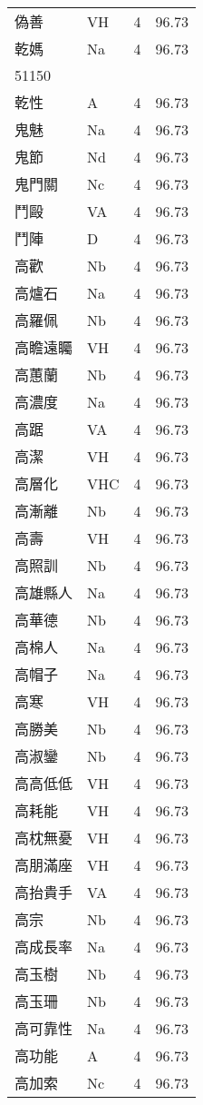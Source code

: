 \documentclass[twocolumn]{book}
\begin{document}
\begin{supertabular}{llrr}
偽善 & VH & 4 &  96.73\\
乾媽 & Na & 4 &  96.73\\
51150\\
乾性 & A & 4 &  96.73\\
鬼魅 & Na & 4 &  96.73\\
鬼節 & Nd & 4 &  96.73\\
鬼門關 & Nc & 4 &  96.73\\
鬥毆 & VA & 4 &  96.73\\
鬥陣 & D & 4 &  96.73\\
高歡 & Nb & 4 &  96.73\\
高爐石 & Na & 4 &  96.73\\
高羅佩 & Nb & 4 &  96.73\\
高瞻遠矚 & VH & 4 &  96.73\\
高蕙蘭 & Nb & 4 &  96.73\\
高濃度 & Na & 4 &  96.73\\
高踞 & VA & 4 &  96.73\\
高潔 & VH & 4 &  96.73\\
高層化 & VHC & 4 &  96.73\\
高漸離 & Nb & 4 &  96.73\\
高壽 & VH & 4 &  96.73\\
高照訓 & Nb & 4 &  96.73\\
高雄縣人 & Na & 4 &  96.73\\
高華德 & Nb & 4 &  96.73\\
高棉人 & Na & 4 &  96.73\\
高帽子 & Na & 4 &  96.73\\
高寒 & VH & 4 &  96.73\\
高勝美 & Nb & 4 &  96.73\\
高淑鑾 & Nb & 4 &  96.73\\
高高低低 & VH & 4 &  96.73\\
高耗能 & VH & 4 &  96.73\\
高枕無憂 & VH & 4 &  96.73\\
高朋滿座 & VH & 4 &  96.73\\
高抬貴手 & VA & 4 &  96.73\\
高宗 & Nb & 4 &  96.73\\
高成長率 & Na & 4 &  96.73\\
高玉樹 & Nb & 4 &  96.73\\
高玉珊 & Nb & 4 &  96.73\\
高可靠性 & Na & 4 &  96.73\\
高功能 & A & 4 &  96.73\\
高加索 & Nc & 4 &  96.73\\

\end{supertabular}
\end{document}
